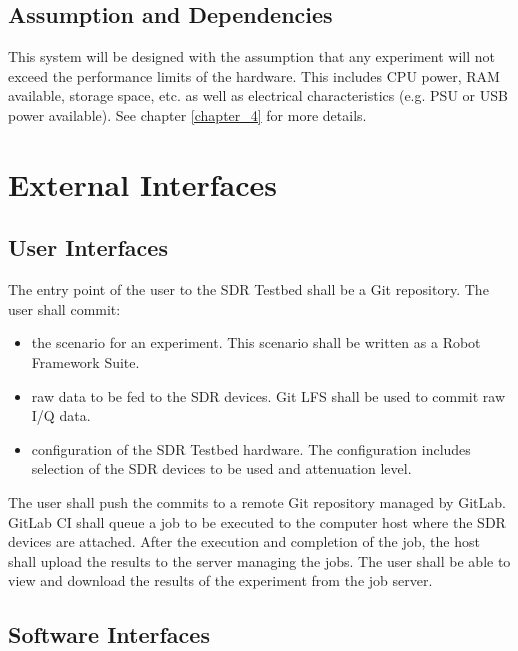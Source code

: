 \documentclass[english,titlepage,a4paper]{report}
\begin{document}
\section{Assumption and Dependencies}

This system will be designed with the assumption that any experiment will not exceed the performance limits of the hardware.
This includes CPU power, RAM available, storage space, etc. as well as electrical characteristics (e.g. PSU or USB power available).
See chapter \ref{chapter_4} for more details.


\chapter{External Interfaces}
\section{User Interfaces}

The entry point of the user to the SDR Testbed shall be a Git repository.
The user shall commit:
\begin{itemize}
\item the scenario for an experiment.
  This scenario shall be written as a Robot Framework Suite.
\item raw data to be fed to the SDR devices.
  Git LFS shall be used to commit raw I/Q data.
\item configuration of the SDR Testbed hardware.
  The configuration includes selection of the SDR devices to be used and attenuation level.
\end{itemize}
The user shall push the commits to a remote Git repository managed by GitLab.
GitLab CI shall queue a job to be executed to the computer host where the SDR devices are attached.
After the execution and completion of the job, the host shall upload the results to the server managing the jobs.
The user shall be able to view and download the results of the experiment from the job server.

\section{Software Interfaces}
\end{document}
